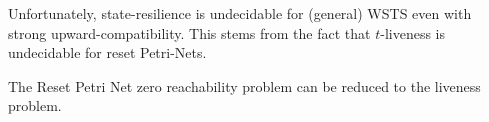 

%
%
%






Unfortunately, state-resilience is undecidable for (general) WSTS even with strong upward-compatibility.
This stems from the fact that $t$-liveness is undecidable for reset Petri-Nets.


\begin{theorem}\label{liveness reset}
The  Reset Petri Net zero reachability problem can be reduced to the liveness problem.
\end{theorem}

